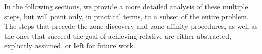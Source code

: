 In the following sections, we provide a more detailed analysis of these multiple steps, but will point only, in practical terms, to a subset of the entire problem. The steps that precede the zone discovery and zone affinity procedures, as well as the ones that succeed the goal of achieving relative \pol{} are either abstracted, explicitly assumed, or left for future work.

